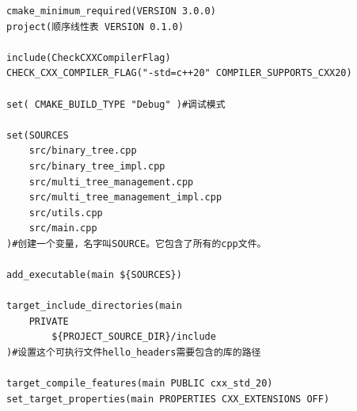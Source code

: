 \documentclass[supercite]{Experimental_Report}
\theoremstyle{definition}
\begin{document}
\begin{lstlisting}[caption={$CMakeLists.txt$}, frame=single]
cmake_minimum_required(VERSION 3.0.0)
project(顺序线性表 VERSION 0.1.0)

include(CheckCXXCompilerFlag)
CHECK_CXX_COMPILER_FLAG("-std=c++20" COMPILER_SUPPORTS_CXX20)

set( CMAKE_BUILD_TYPE "Debug" )#调试模式

set(SOURCES
	src/binary_tree.cpp
	src/binary_tree_impl.cpp
	src/multi_tree_management.cpp
	src/multi_tree_management_impl.cpp
	src/utils.cpp
	src/main.cpp
)#创建一个变量，名字叫SOURCE。它包含了所有的cpp文件。

add_executable(main ${SOURCES})

target_include_directories(main
	PRIVATE 
		${PROJECT_SOURCE_DIR}/include
)#设置这个可执行文件hello_headers需要包含的库的路径

target_compile_features(main PUBLIC cxx_std_20)
set_target_properties(main PROPERTIES CXX_EXTENSIONS OFF)	
\end{lstlisting}

\newpage
\end{document}
